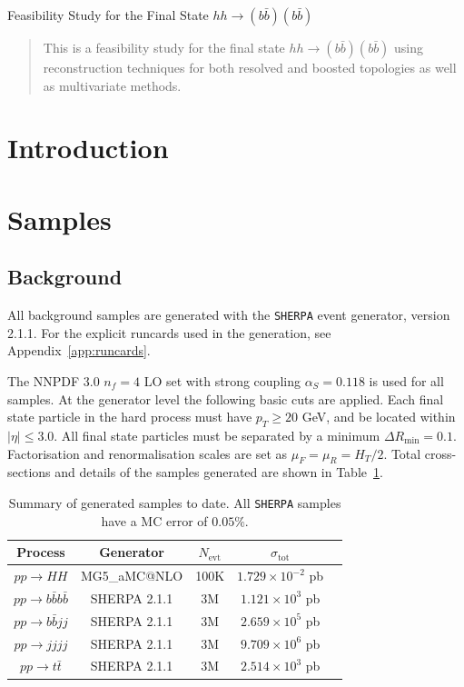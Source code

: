 \documentclass[12pt]{article}
\newcommand\pubnumber{DRAFT-001}
\newcommand\pubdate{\today}
\def\Title#1{\begin{center} {\Large #1 } \end{center}}
\def\Author#1{\begin{center}{ \sc #1} \end{center}}
\def\Address#1{\begin{center}{ \it #1} \end{center}}
\newcommand\pubblock{\rightline{\begin{tabular}{l} \pubnumber\\
         \pubdate  \end{tabular}}}
\newenvironment{Abstract}{\begin{quotation}  }{\end{quotation}}
\begin{document}
\begin{titlepage}
\hspace{-1.4cm}\pubblock

\vfill
\Title{Feasibility Study for the Final State $hh\rightarrow (b\bar{b})(b\bar{b})$}
\vfill
\Author{}
\Address{}
\vfill
\begin{Abstract}
This is a feasibility study for the final state $hh\rightarrow (b\bar{b})(b\bar{b})$ using reconstruction techniques for both resolved
and boosted topologies as well as multivariate methods.
\end{Abstract}
\vfill
\end{titlepage}
\def\thefootnote{\fnsymbol{footnote}}
\setcounter{footnote}{0}
%

\section{Introduction}


\section{Samples}
\label{sec:samples}
\subsection{Background}
All background samples are generated with the {\tt SHERPA} event generator, version 2.1.1. For the explicit runcards used in the generation, see Appendix~\ref{app:runcards}.

The NNPDF 3.0 $n_f = 4$ LO set with strong coupling $\alpha_S=0.118$ is used for all samples. At the generator level the following basic cuts are applied. Each final state particle in the hard process must have $p_T \ge 20$ GeV, and be located within $| \eta | \le 3.0$. All final state particles must be separated by a minimum $\Delta R_{\mathrm{min}} =0.1$. Factorisation and renormalisation scales are set as $\mu_F=\mu_R=H_T/2$. Total cross-sections and details of the samples generated are shown in Table~\ref{tab:samples}. 


\begin{table}[h]
\begin{center}
\begin{tabular}{|c|c|c|c|c|}
\hline
Process &  Generator & $N_{\mathrm{evt}}$ & $\sigma_{\mathrm{tot}}$ \\
\hline
\hline
$pp \to HH$ &  MG5\_aMC@NLO & 100K & $1.729\times10^{-2}$ pb \\
\hline
$pp \to b\bar{b}b\bar{b}$ &  SHERPA 2.1.1 & 3M &$1.121 \times10^3$ pb \\
$pp \to b\bar{b}jj$ &  SHERPA 2.1.1 & 3M & $2.659 \times 10^5$ pb \\
$pp \to jjjj$ &  SHERPA 2.1.1 & 3M  & $9.709\times 10^6$ pb \\
$pp \to t\bar{t}$ &  SHERPA 2.1.1 & 3M & $2.514\times 10^3$ pb \\
\hline
\end{tabular}
\caption{Summary of generated samples to date. All {\tt SHERPA} samples have a MC error of $0.05\%$.} \label{tab:samples}
\end{center}
\end{table}%
\end{document}
